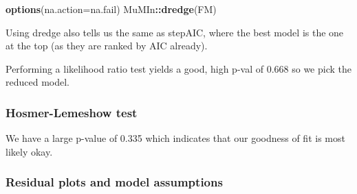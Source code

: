 \documentclass[]{article}
\newenvironment{Shaded}{\begin{snugshade}}{\end{snugshade}}
\newcommand{\CommentTok}[1]{\textcolor[rgb]{0.56,0.35,0.01}{\textit{#1}}}
\newcommand{\DataTypeTok}[1]{\textcolor[rgb]{0.13,0.29,0.53}{#1}}
\newcommand{\DecValTok}[1]{\textcolor[rgb]{0.00,0.00,0.81}{#1}}
\newcommand{\KeywordTok}[1]{\textcolor[rgb]{0.13,0.29,0.53}{\textbf{#1}}}
\newcommand{\NormalTok}[1]{#1}
\newcommand{\OperatorTok}[1]{\textcolor[rgb]{0.81,0.36,0.00}{\textbf{#1}}}
\newcommand{\StringTok}[1]{\textcolor[rgb]{0.31,0.60,0.02}{#1}}
\begin{document}
\begin{Shaded}
\begin{Highlighting}[]
\KeywordTok{options}\NormalTok{(}\DataTypeTok{na.action=}\NormalTok{na.fail)}
\NormalTok{MuMIn}\OperatorTok{::}\KeywordTok{dredge}\NormalTok{(FM)}
\end{Highlighting}
\end{Shaded}

Using dredge also tells us the same as stepAIC, where the best model is
the one at the top (as they are ranked by AIC already).

\begin{Shaded}
\end{Shaded}

Performing a likelihood ratio test yields a good, high p-val of 0.668 so
we pick the reduced model.

\hypertarget{hosmer-lemeshow-test}{%
\subsubsection{Hosmer-Lemeshow test}\label{hosmer-lemeshow-test}}

\begin{Shaded}
\end{Shaded}

We have a large p-value of 0.335 which indicates that our goodness of
fit is most likely okay.

\newpage

\hypertarget{residual-plots-and-model-assumptions}{%
\subsubsection{Residual plots and model
assumptions}\label{residual-plots-and-model-assumptions}}
\end{document}
